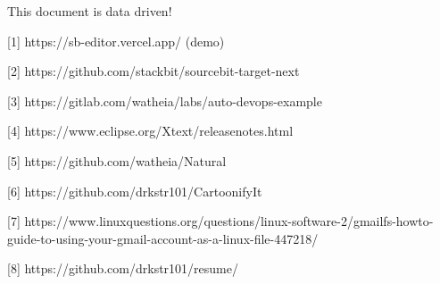 
This document is data driven!


\bigskip

[1] https://sb-editor.vercel.app/ (demo)

[2] https://github.com/stackbit/sourcebit-target-next

[3] https://gitlab.com/watheia/labs/auto-devops-example

[4] https://www.eclipse.org/Xtext/releasenotes.html

[5] https://github.com/watheia/Natural

[6] https://github.com/drkstr101/CartoonifyIt

[7] https://www.linuxquestions.org/questions/linux-software-2/gmailfs-howto-guide-to-using-your-gmail-account-as-a-linux-file-447218/

[8] https://github.com/drkstr101/resume/
